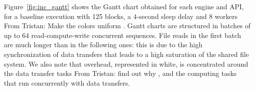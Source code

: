 \documentclass[conference]{IEEEtran}
\newcommand{\TG}[1]{\color{cyan}From Tristan: #1 \color{black}}
\begin{document}
Figure~\ref{fig:inc_gantt} shows the Gantt chart obtained for each engine
and API, for a baseline execution with 125 blocks, a 4-second sleep delay
and 8 workers \TG{Make the colors uniform}. Gantt charts are structured in 
batches of up to 64 read-compute-write concurrent sequences.
File reads in the first batch are much longer than in the following ones:
this is due to the high synchronization of data transfers that leads to a
high saturation of the shared file system. We also note that overhead,
represented in white, is concentrated around the data transfer tasks
\TG{find out why}, and the computing tasks that run concurrently with data
transfers. 
\end{document}
